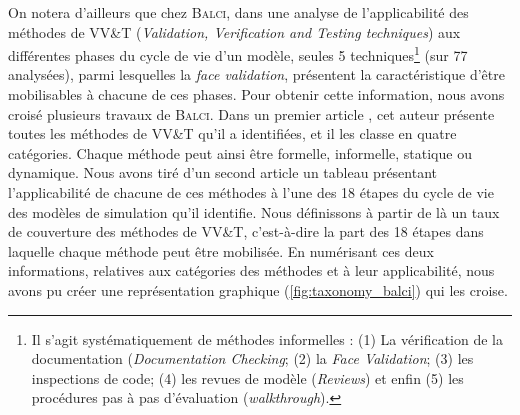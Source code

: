 On notera d'ailleurs que chez B\textsc{alci}, dans une analyse de l'applicabilité des méthodes de \og VV\&T\fg{} (\textit{Validation, Verification and Testing techniques}) aux différentes phases du cycle de vie d'un modèle, seules 5 techniques\footnote{
	Il s'agit systématiquement de méthodes \og informelles\fg{} : 
	(1) La vérification de la documentation (\textit{Documentation Checking}; (2) la \textit{Face Validation}; (3) les inspections de code; (4) les \og revues\fg{} de modèle (\textit{Reviews}) et enfin (5) les \og procédures pas à pas\fg{} d'évaluation (\textit{walkthrough}).
} (sur 77 analysées), parmi lesquelles la \textit{face validation}, présentent la caractéristique d'être mobilisables à chacune de ces phases.
Pour obtenir cette information, nous avons croisé plusieurs travaux de \textsc{Balci}.
Dans un premier article \autocite{balci_verification_1997}, cet auteur présente toutes les méthodes de VV\&T qu'il a identifiées, et il les classe en quatre catégories.
Chaque méthode peut ainsi être formelle, informelle, statique ou dynamique.
Nous avons tiré d'un second article \autocite{balci1998verification} un tableau présentant l'applicabilité de chacune de ces méthodes à l'une des 18 étapes du \og cycle de vie\fg{} des modèles de simulation qu'il identifie.
Nous définissons à partir de là un \og taux de couverture\fg{} des méthodes de VV\&T, c'est-à-dire la part des 18 étapes dans laquelle chaque méthode peut être mobilisée.
En numérisant ces deux informations, relatives aux catégories des méthodes et à leur applicabilité, nous avons pu créer une représentation graphique (\cref{fig:taxonomy_balci}) qui les croise.


